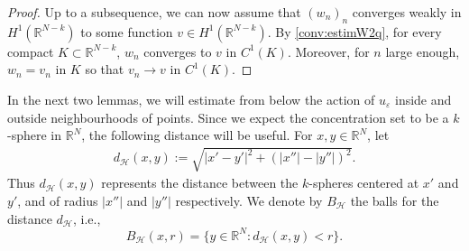 \documentclass[a4paper]{amsart}
\begin{document}
\begin{proof}
Up to a subsequence, we can now assume that $(w_n)_n$ converges weakly in $H^1({\mathbb{R}}^{N-k})$ to some function $v \in
H^1({\mathbb{R}}^{N-k})$. By \eqref{conv:estimW2q}, for every
compact $K \subset {\mathbb{R}}^{N-k}$, $w_n$ converges to $v$ in $C^1(K)$. Moreover, for $n$ large enough, $w_n = v_n$ in $K$ so that $v_n\to v$ in
$C^1(K)$.
\end{proof}

In the next two lemmas, we will estimate from below the action of $u_{\varepsilon}$ inside and outside neighbourhoods of
points. Since we expect the concentration set to be a $k$-sphere in ${\mathbb{R}}^N$, the following distance will be useful. For
$x,y \in {\mathbb{R}}^N$, let
\begin{align*}
 d_{\mathcal{H}}(x,y) := \sqrt{{\left| {x'-y'} \right|}^2+ \left( {\left| {x''} \right|}-{\left| {y''} \right|}\right) ^2}.
\end{align*}
Thus $d_{\mathcal{H}}(x,y)$ represents the distance between the $k$-spheres centered at $x'$ and $y'$, and of radius
${\left| {x''} \right|}$ and ${\left| {y''} \right|}$ respectively. 
We denote by $B_{\mathcal{H}}$ the balls for the distance $d_{\mathcal{H}}$, i.e.,
\[
 B_{\mathcal{H}}(x,r)=\{ y \in {\mathbb{R}}^N : d_{\mathcal{H}}(x, y) < r\}.
\]
\end{document}
